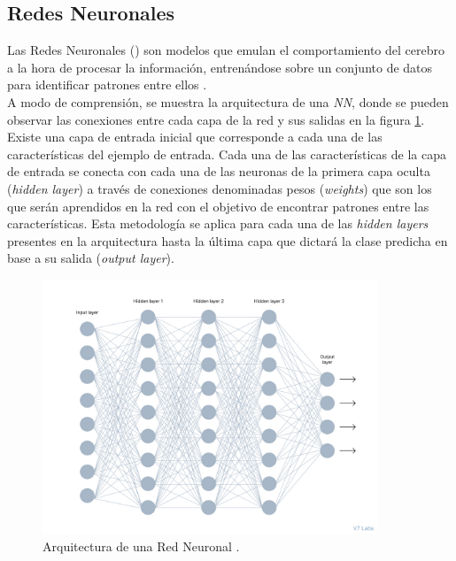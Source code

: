         \subsection {Redes Neuronales}

            Las Redes Neuronales () son modelos que emulan el comportamiento del cerebro a la hora de procesar la información, entrenándose sobre un conjunto de datos para identificar patrones entre ellos \cite{NNReview}.\\

            A modo de comprensión, se muestra la arquitectura de una \textit{NN}, donde se pueden observar las conexiones entre cada capa de la red y sus salidas en la figura \ref{NNImage}. Existe una capa de entrada inicial que corresponde a cada una de las características del ejemplo de entrada. Cada una de las características de la capa de entrada se conecta con cada una de las neuronas de la primera capa oculta (\textit{hidden layer}) a través de conexiones denominadas pesos (\textit{weights}) que son los que serán aprendidos en la red con el objetivo de encontrar patrones entre las características. Esta metodología se aplica para cada una de las \textit{hidden layers} presentes en la arquitectura hasta la última capa que dictará la clase predicha en base a su salida (\textit{output layer}).\\

            \begin{figure}[h]
                \centering
                \includegraphics[width=10cm]{archivos/3.Tecnologias/RedesNeuronales/NNImage}
                \caption{Arquitectura de una Red Neuronal \cite{ReferenciaImagenNN}.}
                \label{NNImage}
             \end{figure}




